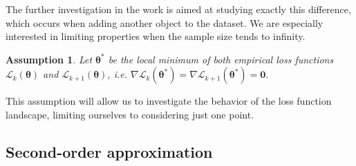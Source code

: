 \documentclass{article}
\newtheorem{assumption}{Assumption}
\begin{document}
The further investigation in the work is aimed at studying exactly this difference, which occurs when adding another object to the dataset. We are especially interested in limiting properties when the sample size tends to infinity.

\begin{assumption}\label{assumpt}
    Let $\boldsymbol{\theta}^*$ be the local minimum of both empirical loss functions $\mathcal{L}_{k}(\boldsymbol{\theta})$ and $\mathcal{L}_{k+1}(\boldsymbol{\theta})$, i.e. $\nabla \mathcal{L}_{k}(\boldsymbol{\theta}^*) = \nabla \mathcal{L}_{k+1}(\boldsymbol{\theta}^*) = \mathbf{0}$.
\end{assumption}

This assumption will allow us to investigate the behavior of the loss function landscape, limiting ourselves to considering just one point. 

\subsection{Second-order approximation} 
\end{document}
